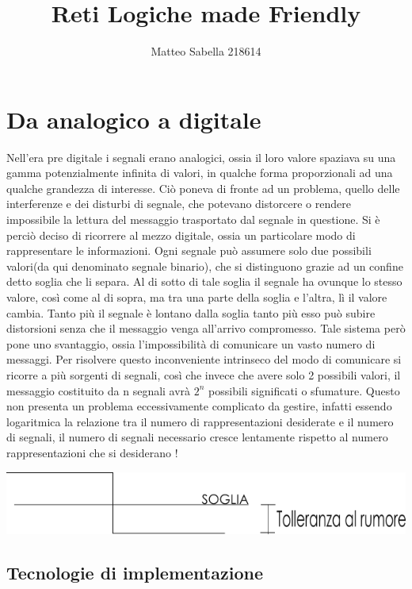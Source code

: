 \documentclass[a4paper]{book}
\title{Reti Logiche made Friendly}
\author{Matteo Sabella 218614}
\begin{document}
\maketitle


\chapter{Da analogico a digitale}
Nell'era pre digitale i segnali erano analogici, ossia il loro valore spaziava su una gamma potenzialmente infinita di valori, in qualche forma proporzionali ad una qualche grandezza di interesse.
Ciò poneva di fronte ad un problema, quello delle interferenze e dei disturbi di segnale, che potevano distorcere o rendere impossibile la lettura del messaggio trasportato dal segnale in questione.
Si è perciò deciso di ricorrere al mezzo digitale, ossia un particolare modo di rappresentare le informazioni.
Ogni segnale può assumere solo due possibili valori(da qui denominato segnale binario), che si distinguono grazie ad un confine detto soglia che li separa.
Al di sotto di tale soglia il segnale ha ovunque lo stesso valore, così come al di sopra, ma tra una parte della soglia e l'altra, lì il valore cambia.
Tanto più il segnale è lontano dalla soglia tanto più esso può subire distorsioni senza che il messaggio venga all'arrivo compromesso.
Tale sistema però pone uno svantaggio, ossia l'impossibilità di comunicare un vasto numero di messaggi.
Per risolvere questo inconveniente intrinseco del modo di comunicare si ricorre a più sorgenti di segnali, così che invece che avere solo 2 possibili valori, il messaggio costituito da n segnali avrà \(2^n\) possibili significati o sfumature.
Questo non presenta un problema eccessivamente complicato da gestire, infatti essendo logaritmica la relazione tra il numero di rappresentazioni desiderate e il numero di segnali, il numero di segnali necessario cresce lentamente rispetto al numero rappresentazioni che si desiderano ! 

\includegraphics[width=\textwidth]{SchemaDigitale}

\newpage
\section*{Tecnologie di implementazione}
\end{document}
